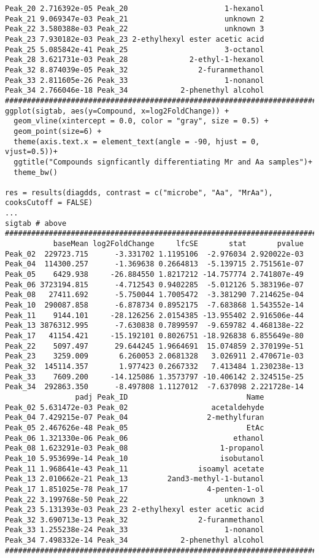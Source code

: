 \documentclass[]{article}
\begin{document}
\begin{verbatim}
Peak_20 2.716392e-05 Peak_20                      1-hexanol
Peak_21 9.069347e-03 Peak_21                      unknown 2
Peak_22 3.580388e-03 Peak_22                      unknown 3
Peak_23 7.930182e-03 Peak_23 2-ethylhexyl ester acetic acid
Peak_25 5.085842e-41 Peak_25                      3-octanol
Peak_28 3.621731e-03 Peak_28              2-ethyl-1-hexanol
Peak_32 8.874039e-05 Peak_32                2-furanmethanol
Peak_33 2.811605e-26 Peak_33                      1-nonanol
Peak_34 2.766046e-18 Peak_34            2-phenethyl alcohol
#####################################################################################
ggplot(sigtab, aes(y=Compound, x=log2FoldChange)) + 
  geom_vline(xintercept = 0.0, color = "gray", size = 0.5) +
  geom_point(size=6) + 
  theme(axis.text.x = element_text(angle = -90, hjust = 0, vjust=0.5))+
  ggtitle("Compounds signficantly differentiating Mr and Aa samples")+
  theme_bw()

res = results(diagdds, contrast = c("microbe", "Aa", "MrAa"), cooksCutoff = FALSE)
...
sigtab # above
########################################################################################
           baseMean log2FoldChange     lfcSE       stat       pvalue
Peak_02  229723.715      -3.331702 1.1195106  -2.976034 2.920022e-03
Peak_04  114300.257      -1.369638 0.2664813  -5.139715 2.751561e-07
Peak_05    6429.938     -26.884550 1.8217212 -14.757774 2.741807e-49
Peak_06 3723194.815      -4.712543 0.9402285  -5.012126 5.383196e-07
Peak_08   27411.692      -5.750044 1.7005472  -3.381290 7.214625e-04
Peak_10  290087.858      -6.878734 0.8952175  -7.683868 1.543552e-14
Peak_11    9144.101     -28.126256 2.0154385 -13.955402 2.916506e-44
Peak_13 3876312.995      -7.630838 0.7899597  -9.659782 4.468138e-22
Peak_17   41154.421     -15.192101 0.8026751 -18.926838 6.855649e-80
Peak_22    5097.497      29.644245 1.9664691  15.074859 2.370199e-51
Peak_23    3259.009       6.260053 2.0681328   3.026911 2.470671e-03
Peak_32  145114.357       1.977423 0.2667332   7.413484 1.230238e-13
Peak_33    7609.200     -14.125086 1.3573797 -10.406142 2.324515e-25
Peak_34  292863.350      -8.497808 1.1127012  -7.637098 2.221728e-14
                padj Peak_ID                           Name
Peak_02 5.631472e-03 Peak_02                   acetaldehyde
Peak_04 7.429215e-07 Peak_04                  2-methylfuran
Peak_05 2.467626e-48 Peak_05                           EtAc
Peak_06 1.321330e-06 Peak_06                        ethanol
Peak_08 1.623291e-03 Peak_08                     1-propanol
Peak_10 5.953699e-14 Peak_10                     isobutanol
Peak_11 1.968641e-43 Peak_11                isoamyl acetate
Peak_13 2.010662e-21 Peak_13         2and3-methyl-1-butanol
Peak_17 1.851025e-78 Peak_17                  4-penten-1-ol
Peak_22 3.199768e-50 Peak_22                      unknown 3
Peak_23 5.131393e-03 Peak_23 2-ethylhexyl ester acetic acid
Peak_32 3.690713e-13 Peak_32                2-furanmethanol
Peak_33 1.255238e-24 Peak_33                      1-nonanol
Peak_34 7.498332e-14 Peak_34            2-phenethyl alcohol
###########################################################################################


\end{verbatim}
\end{document}
